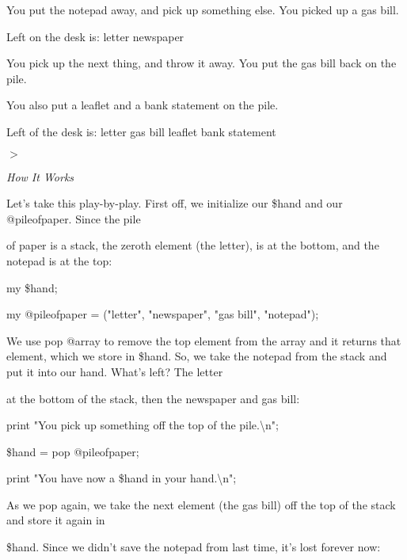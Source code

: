 \documentclass[a4paper,11pt]{book}
\begin{document}
\noindent You put the notepad away, and pick up something else. You picked up a gas bill.

\noindent Left on the desk is: letter newspaper

\noindent You pick up the next thing, and throw it away. You put the gas bill back on the pile.

\noindent You also put a leaflet and a bank statement on the pile.

\noindent Left of the desk is: letter gas bill leaflet bank statement

\noindent $>$

\noindent 

\noindent \textit{How It Works}

\noindent Let's take this play-by-play. First off, we initialize our \$hand and our @pileofpaper. Since the pile

\noindent of paper is a stack, the zeroth element (the letter), is at the bottom, and the notepad is at the top:

\noindent 

\noindent 

\noindent my \$hand;

\noindent my @pileofpaper = ("letter", "newspaper", "gas bill", "notepad");

\noindent 

\noindent We use pop @array to remove the top element from the array and it returns that element, which we store in \$hand. So, we take the notepad from the stack and put it into our hand. What's left? The letter

\noindent at the bottom of the stack, then the newspaper and gas bill:

\noindent 

\noindent 

\noindent print "You pick up something off the top of the pile.\textbackslash n";

\noindent \$hand = pop @pileofpaper;

\noindent print "You have now a \$hand in your hand.\textbackslash n";

\noindent 

\noindent 

\noindent As we pop again, we take the next element (the gas bill) off the top of the stack and store it again in

\noindent \$hand. Since we didn't save the notepad from last time, it's lost forever now:

\noindent 
\end{document}
